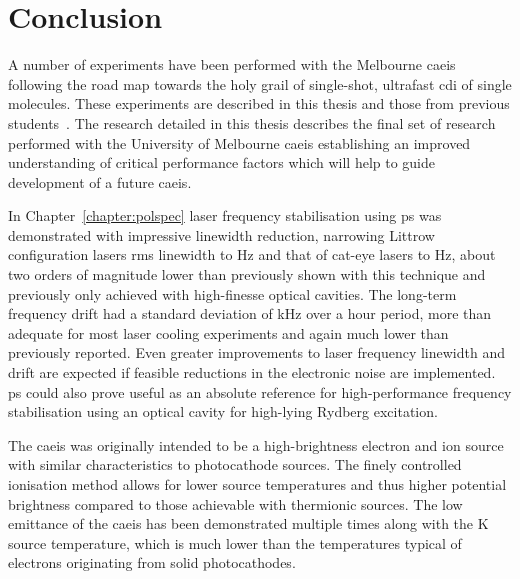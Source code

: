 \chapter{Conclusion}
\glsresetall

A number of experiments have been performed with the Melbourne \gls{caeis} following the road map towards the holy grail of single-shot, ultrafast \gls{cdi} of single molecules.
These experiments are described in this thesis and those from previous students~\cite{sheludko_shaped_2010,bell_cold_2011,saliba_cold_2011,mcculloch_generation_2013,taylor_rydberg_2013,tielen_development_2015,murphy_measurement_2017,speirs_electron_2017}.
The research detailed in this thesis describes the final set of research performed with the University of Melbourne \gls{caeis} establishing an improved understanding of critical performance factors which will help to guide development of a future \gls{caeis}.

In Chapter~\ref{chapter:polspec} laser frequency stabilisation using \gls{ps} was demonstrated with impressive linewidth reduction, narrowing Littrow configuration lasers \gls{rms} linewidth to \unit[600]{Hz} and that of cat-eye lasers to \unit[360]{Hz}, about two orders of magnitude lower than previously shown with this technique and previously only achieved with high-finesse optical cavities.
The long-term frequency drift had a standard deviation of \unit[51]{kHz} over a \unit[60]{hour} period, more than adequate for most laser cooling experiments and again much lower than previously reported.
Even greater improvements to laser frequency linewidth and drift are expected if feasible reductions in the electronic noise are implemented.
\Gls{ps} could also prove useful as an absolute reference for high-performance frequency stabilisation using an optical cavity for high-lying Rydberg excitation.

The \gls{caeis} was originally intended to be a high-brightness electron and ion source with similar characteristics to photocathode sources.
The finely controlled ionisation method allows for lower source temperatures and thus higher potential brightness compared to those achievable with thermionic sources.
The low emittance of the \gls{caeis} has been demonstrated multiple times along with the \unit[10]{K} source temperature, which is much lower than the temperatures typical of electrons originating from solid photocathodes.

